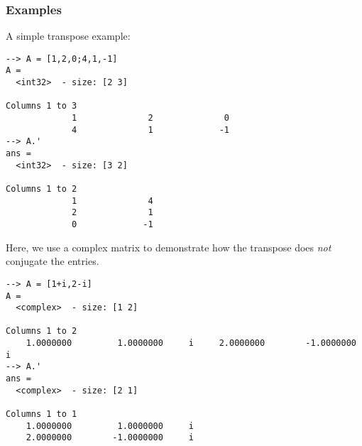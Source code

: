 \subsubsection{Examples}
A simple transpose example:
\begin{verbatim}
--> A = [1,2,0;4,1,-1]
A =
  <int32>  - size: [2 3]
  
Columns 1 to 3
             1              2              0
             4              1             -1
--> A.'
ans =
  <int32>  - size: [3 2]
  
Columns 1 to 2
             1              4
             2              1
             0             -1
\end{verbatim}
Here, we use a complex matrix to demonstrate how the transpose does \emph{not} conjugate the entries.
\begin{verbatim}
--> A = [1+i,2-i]
A =
  <complex>  - size: [1 2]
  
Columns 1 to 2
    1.0000000         1.0000000     i     2.0000000        -1.0000000     i
--> A.'
ans =
  <complex>  - size: [2 1]
  
Columns 1 to 1
    1.0000000         1.0000000     i
    2.0000000        -1.0000000     i
\end{verbatim}
